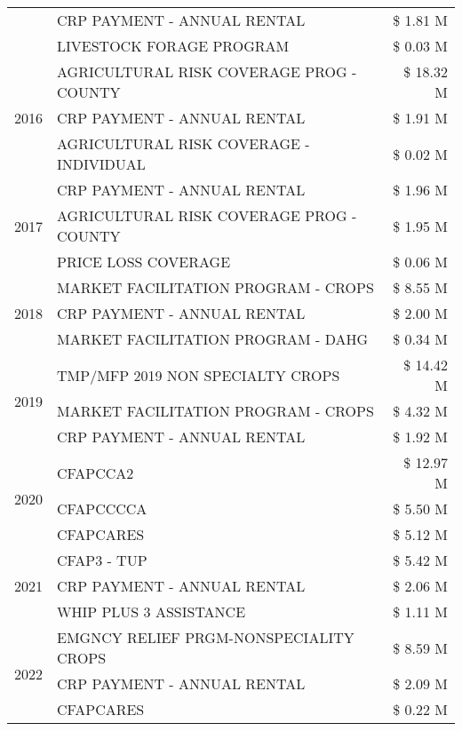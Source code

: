 \begin{tabular}{llr}
 & CRP PAYMENT - ANNUAL RENTAL & \$ 1.81 M \\
 & LIVESTOCK FORAGE PROGRAM & \$ 0.03 M \\
\cline{1-3}
\multirow[t]{3}{*}{2016} & AGRICULTURAL RISK COVERAGE PROG - COUNTY & \$ 18.32 M \\
 & CRP PAYMENT - ANNUAL RENTAL & \$ 1.91 M \\
 & AGRICULTURAL RISK COVERAGE - INDIVIDUAL & \$ 0.02 M \\
\cline{1-3}
\multirow[t]{3}{*}{2017} & CRP PAYMENT - ANNUAL RENTAL & \$ 1.96 M \\
 & AGRICULTURAL RISK COVERAGE PROG - COUNTY & \$ 1.95 M \\
 & PRICE LOSS COVERAGE & \$ 0.06 M \\
\cline{1-3}
\multirow[t]{3}{*}{2018} & MARKET FACILITATION PROGRAM - CROPS & \$ 8.55 M \\
 & CRP PAYMENT - ANNUAL RENTAL & \$ 2.00 M \\
 & MARKET FACILITATION PROGRAM - DAHG & \$ 0.34 M \\
\cline{1-3}
\multirow[t]{3}{*}{2019} & TMP/MFP 2019 NON SPECIALTY CROPS & \$ 14.42 M \\
 & MARKET FACILITATION PROGRAM - CROPS & \$ 4.32 M \\
 & CRP PAYMENT - ANNUAL RENTAL & \$ 1.92 M \\
\cline{1-3}
\multirow[t]{3}{*}{2020} & CFAPCCA2 & \$ 12.97 M \\
 & CFAPCCCCA & \$ 5.50 M \\
 & CFAPCARES & \$ 5.12 M \\
\cline{1-3}
\multirow[t]{3}{*}{2021} & CFAP3 - TUP & \$ 5.42 M \\
 & CRP PAYMENT - ANNUAL RENTAL & \$ 2.06 M \\
 & WHIP PLUS 3 ASSISTANCE & \$ 1.11 M \\
\cline{1-3}
\multirow[t]{3}{*}{2022} & EMGNCY RELIEF PRGM-NONSPECIALITY CROPS & \$ 8.59 M \\
 & CRP PAYMENT - ANNUAL RENTAL & \$ 2.09 M \\
 & CFAPCARES & \$ 0.22 M \\
\cline{1-3}
\bottomrule
\end{tabular}
